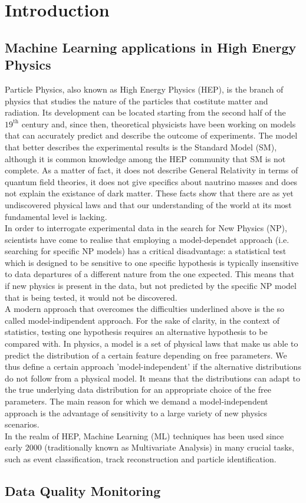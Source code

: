 \chapter{Introduction}
\label{chap:Introduction}

\section{Machine Learning applications in High Energy Physics}

Particle Physics, also known as High Energy Physics (HEP), is the branch of physics that studies the nature of the
particles that costitute matter and radiation. Its development can be located starting from the second half of the
$19^{\text{th}}$ century and, since then, theoretical physicists have been working on models that can accurately predict
and describe the outcome of experiments. The model that better describes the experimental results is the Standard Model
(SM), although it is common knowledge among the HEP community that SM is not complete. As a matter of fact, it does not
describe General Relativity in terms of quantum field theories, it does not give specifics about nautrino masses and
does not explain the existance of dark matter. These facts show that there are as yet undiscovered physical laws and
that our understanding of the world at its most fundamental level is lacking.\\

In order to interrogate experimental data in the search for New Physics (NP), scientists have come to realise that
employing a model-dependet approach (i.e. searching for specific NP models) has a critical disadvantage: a statistical
test which is designed to be sensitive to one specific hypothesis is typically insensitive to data departures of a
different nature from the one expected. This means that if new physics is present in the data, but not predicted by the
specific NP model that is being tested, it would not be discovered.\\

A modern approach that overcomes the difficulties underlined above is the so called model-indipendent approach. For the
sake of clarity, in the context of statistics, testing one hypothesis requires an alternative hypothesis to be compared
with. In physics, a model is a set of physical laws that make us able to predict the distribution of a certain feature
depending on free parameters. We thus define a certain approach 'model-independent' if the alternative distributions do
not follow from a physical model. It means that the distributions can adapt to the true underlying data distribution for
an appropriate choice of the free parameters. The main reason for which we demand a model-independent approach is the
advantage of sensitivity to a large variety of new physics scenarios.\\

In the realm of HEP, Machine Learning (ML) techniques has been used since early $2000$ (traditionally known as
Multivariate Analysis) in many crucial tasks, such as event classification, track reconstruction and particle
identification. 



\section{Data Quality Monitoring}


